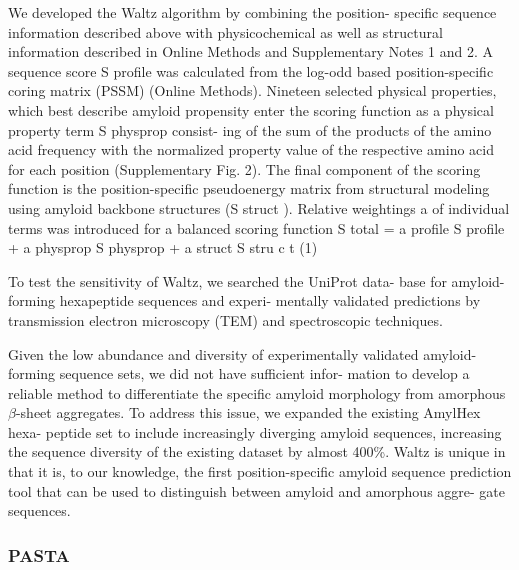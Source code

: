 We developed the Waltz algorithm by combining the position-
specific sequence information described above with physicochemical as well as structural information described in Online
Methods and Supplementary Notes 1 and 2. A sequence score
S profile was calculated from the log-odd based position-specific
coring matrix (PSSM) (Online Methods). Nineteen selected
physical properties, which best describe amyloid propensity enter
the scoring function as a physical property term S physprop consist-
ing of the sum of the products of the amino acid frequency with
the normalized property value of the respective amino acid for
each position (Supplementary Fig. 2). The final component of
the scoring function is the position-specific pseudoenergy matrix
from structural modeling using amyloid backbone structures
(S struct ). Relative weightings a of individual terms was introduced
for a balanced scoring function
S total = a profile S profile + a physprop S physprop + a struct S stru c t (1)

To test the sensitivity of Waltz, we searched the UniProt data-
base for amyloid-forming hexapeptide sequences and experi-
mentally validated predictions by transmission electron
microscopy (TEM) and spectroscopic techniques.




Given
the low abundance and diversity of experimentally validated
amyloid-forming sequence sets, we did not have sufficient infor-
mation to develop a reliable method to differentiate the specific
amyloid morphology from amorphous $\beta$-sheet aggregates.
To address this issue, we expanded the existing AmylHex hexa-
peptide set to include increasingly diverging amyloid sequences,
increasing the sequence diversity of the existing dataset by almost
400\%. Waltz is unique in that it is, to our knowledge, the first
position-specific amyloid sequence prediction tool that can be
used to distinguish between amyloid and amorphous aggre-
gate sequences.









\subsubsection{PASTA}


